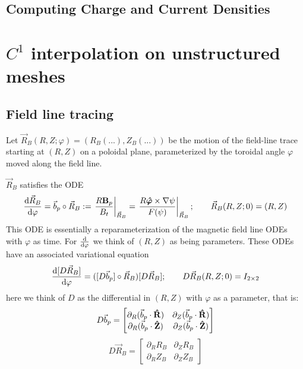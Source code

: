\documentclass[]{article}
\begin{document}
\subsection{Computing Charge and Current Densities}






\section{\(C^1\) interpolation on unstructured meshes}

\subsection{Field line tracing}
Let \(\vec{R}_B(R,Z;\varphi) = (R_B(...), Z_B(...))\) be the motion of the field-line trace starting at \((R,Z)\) on a poloidal plane, parameterized by the toroidal angle \(\varphi\) moved along the field line.

\(\vec{R}_B\) satisfies the ODE
\begin{equation*}
	\dv{\vec{R}_B}{\varphi} = \vec{b}_p \circ \vec{R}_B := \eval{\frac{R\vb{B}_p}{B_t}}_{\vec{R}_B} = \eval{\frac{R \vu*{\varphi} \times \nabla \psi}{F(\psi)}}_{\vec{R}_B}; \qquad
	\vec{R}_B(R,Z;0) = (R,Z)
\end{equation*}
This ODE is essentially a reparameterization of the magnetic field line ODEs with \(\varphi\) as time.
For \(\dv{\varphi}\) we think of \((R,Z)\) as being parameters.
These ODEs have an associated variational equation
\begin{equation*}
	\dv{[D\vec{R}_B]}{\varphi} = ([D\vec{b}_p] \circ \vec{R}_B) [D\vec{R}_B]; \qquad D\vec{R}_B(R,Z;0) = I_{2\times2}
\end{equation*}
here we think of \(D\) as the differential in \((R,Z)\) with \(\varphi\) as a parameter, that is:
\begin{equation*}
	D\vec{b}_p = \begin{bmatrix}
		\partial_R(\vec{b}_p \cdot \vu{R}) & \partial_Z(\vec{b}_p \cdot \vu{R}) \\
		\partial_R(\vec{b}_p \cdot \vu{Z}) & \partial_Z(\vec{b}_p \cdot \vu{Z})
	\end{bmatrix}
\end{equation*}
\begin{equation*}
	D\vec{R}_B = \begin{bmatrix}
		\partial_R R_B & \partial_Z R_B \\
		\partial_R Z_B & \partial_Z Z_B
	\end{bmatrix}
\end{equation*}
\end{document}
